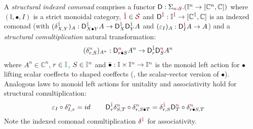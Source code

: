 \begin{definition}
\newcommand{\sunitc}{\sunit} %
%
A \emph{structural indexed comonad} comprises a functor 
$\D : \Sigma_{n : \SH}. (\mathbb{I}^n \rightarrow [\mathbb{C}^n, \mathbb{C}])$
where $(\mathbb{I}, \bullet, I)$ is a strict monoidal category,  
$\sunit \in \SH$ and 
$\D^{\sunit} : \mathbb{I}^\sunit \rightarrow [\mathbb{C}^\sunit, \mathbb{C}]$
 is an indexed comonad (with 
$(\delta^\sunit_{X,Y})_A : \D^\sunit_{X \bullet Y} A \rightarrow \D^\sunit_{X} \D^\sunit_{Y} A$ 
and 
$(\varepsilon_I)_A : \D^\sunit_I A \rightarrow A$) and 
a \emph{structural comultiplication} natural transformation:
$$
(\delta^{\sclrd{n}}_{r, S})_{A^n} : \D^{\sclrd{n}}_{r \bar{\bullet} S} A^n \rightarrow \D^\sunit_r \D^{\sclrd{n}}_S A^n
$$ 
where $A^n \in \mathbb{C}^n$, $r \in \Icat$, $S \in \Icat^{\sclrd{n}}$ and
 $\bbullet : \mathbb{I} \times \mathbb{I}^{\sclrd{n}} \rightarrow \mathbb{I}^{\sclrd{n}}$ is 
 the monoid left action for $\bullet$ lifting scalar coeffects to shaped coeffects (\eg{}, 
the scalar-vector version of $\bullet$).
Analogous laws to monoid left actions for unitality and associativity hold for structural comultiplication:
$$
\varepsilon_I \circ \delta^{\sclrd{n}}_{I, r} = id 
\,\qquad
\D^\sunitc_r \delta^{\sclrd{n}}_{S,T} \circ \delta^{\sclrd{n}}_{r, S \bar{\bullet{}} T}
= 
\delta^\sunitc_{r,S}\D^{\sclrd{n}}_T \circ \delta^{\sclrd{n}}_{r \bar{\bullet{}} S, T}
$$
%
%
%
Note the indexed comonad comultiplication $\delta^\sunitc$ for associativity. 
\label{def:structural-indexed-comonad}
\end{definition}

